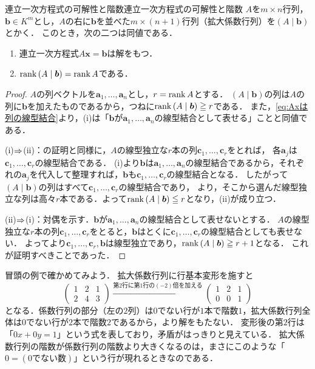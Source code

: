 \begin{prop}{連立一次方程式の可解性と階数}{連立一次方程式の可解性と階数}
  $A$を$m \times n$行列，$\bm{b} \in K^m$とし，$A$の右に$\bm{b}$を並べた$m \times (n+1)$行列（拡大係数行列）を$(A \mid \bm{b})$とかく．
  このとき，次の二つは同値である．
  \begin{enumerate}[label=(\roman*),leftmargin=3.2em]
    \item 連立一次方程式$A\bm{x} = \bm{b}$は解をもつ．
    \item $\operatorname{rank}\, (A \mid \bm{b}) = \operatorname{rank} A$である．
  \end{enumerate}
\end{prop}

\begin{tleftbar}
\begin{proof}
  $A$の列ベクトルを$\bm{a}_1, \dots, \bm{a}_n$とし，$r = \operatorname{rank} A$とする．
  $(A \mid \bm{b})$の列は$A$の列に$\bm{b}$を加えたものであるから，つねに$\operatorname{rank}\, (A \mid \bm{b}) \geqq r$である．
  また，\eqref{eq:Axは列の線型結合}より，(i)は「$\bm{b}$が$\bm{a}_1, \dots, \bm{a}_n$の線型結合として表せる」ことと同値である．

  (i)$\mathrel{\Rightarrow}$(ii)：の証明と同様に，$A$の線型独立な$r$本の列$\bm{c}_1, \dots, \bm{c}_r$をとれば，
  各$\bm{a}_j$は$\bm{c}_1, \dots, \bm{c}_r$の線型結合である．
  (i)より$\bm{b}$は$\bm{a}_1, \dots, \bm{a}_n$の線型結合であるから，それぞれの$\bm{a}_j$を代入して整理すれば，$\bm{b}$も$\bm{c}_1, \dots, \bm{c}_r$の線型結合となる．
  したがって$(A \mid \bm{b})$の列はすべて$\bm{c}_1, \dots, \bm{c}_r$の線型結合であり，
  より，そこから選んだ線型独立な列は高々$r$本である．よって$\operatorname{rank}\, (A \mid \bm{b}) \leqq r$となり，(ii)が成り立つ．

  (ii)$\mathrel{\Rightarrow}$(i)：対偶を示す．$\bm{b}$が$\bm{a}_1, \dots, \bm{a}_n$の線型結合として表せないとする．
  $A$の線型独立な$r$本の列$\bm{c}_1, \dots, \bm{c}_r$をとると，$\bm{b}$はとくに$\bm{c}_1, \dots, \bm{c}_r$の線型結合としても表せない．
  よってより$\bm{c}_1, \dots, \bm{c}_r, \bm{b}$は線型独立であり，$\operatorname{rank}\, (A \mid \bm{b}) \geqq r + 1$となる．
  これが証明すべきことであった．
\end{proof}
\end{tleftbar}

冒頭の例で確かめてみよう．
拡大係数行列に行基本変形を施すと
\[
  \begin{pmatrix} 1 & 2 & 1 \\ 2 & 4 & 3 \end{pmatrix}
  \xrightarrow{\text{第$2$行に第$1$行の$(-2)$倍を加える}}
  \begin{pmatrix} 1 & 2 & 1 \\ 0 & 0 & 1 \end{pmatrix}
\]
となる．係数行列の部分（左の$2$列）は$0$でない行が$1$本で階数$1$，拡大係数行列全体は$0$でない行が$2$本で階数$2$であるから，より解をもたない．
変形後の第$2$行は「$0x + 0y = 1$」という式を表しており，矛盾がはっきりと見えている．
拡大係数行列の階数が係数行列の階数より大きくなるのは，まさにこのような「$0 = (\text{$0$でない数})$」という行が現れるときなのである．

